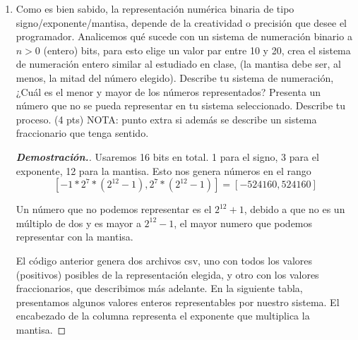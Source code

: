 \documentclass{article}
\begin{document}
\begin{enumerate}
	\item Como es bien sabido, la representaci\'on num\'erica binaria de tipo signo/exponente/mantisa, depende de la creatividad o precisi\'on que desee el programador. Analicemos qu\'e sucede con un sistema de numeraci\'on binario a $n>0$ (entero) bits, para esto elige un valor par entre 10 y 20, crea el sistema de numeraci\'on entero similar al estudiado en clase, (la mantisa debe ser, al menos, la mitad del n\'umero elegido). Describe tu sistema de numeraci\'on, ¿Cu\'al es el menor y mayor de los n\'umeros representados? Presenta un n\'umero que no se pueda representar en tu sistema seleccionado. Describe tu proceso. (4 pts) NOTA: punto extra si adem\'as se describe un sistema fraccionario que tenga sentido.
	      \begin{mdframed}[
			      linecolor=darkgray,
			      backgroundcolor=white]
		      \begin{proof}[\textbf{Demostraci\'on.}]
			      Usaremos 16 bits en total. 1 para el signo, 3 para el exponente, 12 para la mantisa. Esto nos genera n\'umeros en el rango
			      \[ [-1*2^7*(2^{12} - 1), 2^7*(2^{12} - 1)] = [-524160, 524160] \]

			      Un n\'umero que no podemos representar es el $ 2^{12} + 1 $, debido a que no es un m\'ultiplo de dos y es mayor a $ 2^{12} - 1 $, el mayor numero que podemos representar con la mantisa.
			      


			      El c\'odigo anterior genera dos archivos csv, uno con todos los valores (positivos) posibles de la representaci\'on elegida, y otro con los valores fraccionarios, que describimos m\'as adelante. En la siguiente tabla, presentamos algunos valores enteros representables por nuestro sistema. El encabezado de la columna representa el exponente que multiplica la mantisa.


\end{proof}
\end{mdframed}
\end{enumerate}
\end{document}
